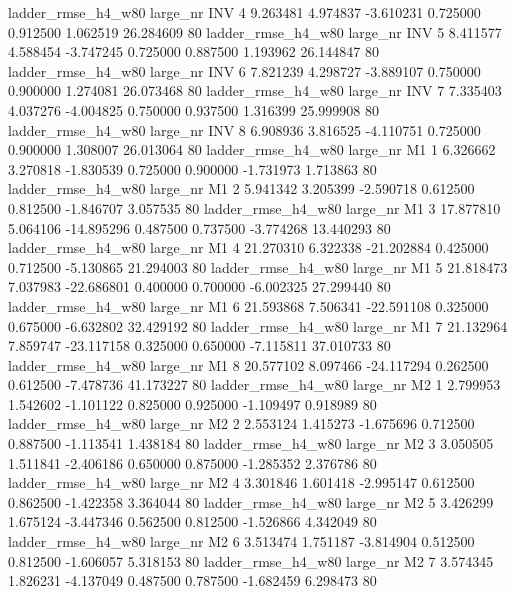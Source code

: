  ladder_rmse_h4_w80   large_nr      INV                 4  9.263481  4.974837  -3.610231 0.725000 0.912500  1.062519   26.284609 80
 ladder_rmse_h4_w80   large_nr      INV                 5  8.411577  4.588454  -3.747245 0.725000 0.887500  1.193962   26.144847 80
 ladder_rmse_h4_w80   large_nr      INV                 6  7.821239  4.298727  -3.889107 0.750000 0.900000  1.274081   26.073468 80
 ladder_rmse_h4_w80   large_nr      INV                 7  7.335403  4.037276  -4.004825 0.750000 0.937500  1.316399   25.999908 80
 ladder_rmse_h4_w80   large_nr      INV                 8  6.908936  3.816525  -4.110751 0.725000 0.900000  1.308007   26.013064 80
 ladder_rmse_h4_w80   large_nr       M1                 1  6.326662  3.270818  -1.830539 0.725000 0.900000 -1.731973    1.713863 80
 ladder_rmse_h4_w80   large_nr       M1                 2  5.941342  3.205399  -2.590718 0.612500 0.812500 -1.846707    3.057535 80
 ladder_rmse_h4_w80   large_nr       M1                 3 17.877810  5.064106 -14.895296 0.487500 0.737500 -3.774268   13.440293 80
 ladder_rmse_h4_w80   large_nr       M1                 4 21.270310  6.322338 -21.202884 0.425000 0.712500 -5.130865   21.294003 80
 ladder_rmse_h4_w80   large_nr       M1                 5 21.818473  7.037983 -22.686801 0.400000 0.700000 -6.002325   27.299440 80
 ladder_rmse_h4_w80   large_nr       M1                 6 21.593868  7.506341 -22.591108 0.325000 0.675000 -6.632802   32.429192 80
 ladder_rmse_h4_w80   large_nr       M1                 7 21.132964  7.859747 -23.117158 0.325000 0.650000 -7.115811   37.010733 80
 ladder_rmse_h4_w80   large_nr       M1                 8 20.577102  8.097466 -24.117294 0.262500 0.612500 -7.478736   41.173227 80
 ladder_rmse_h4_w80   large_nr       M2                 1  2.799953  1.542602  -1.101122 0.825000 0.925000 -1.109497    0.918989 80
 ladder_rmse_h4_w80   large_nr       M2                 2  2.553124  1.415273  -1.675696 0.712500 0.887500 -1.113541    1.438184 80
 ladder_rmse_h4_w80   large_nr       M2                 3  3.050505  1.511841  -2.406186 0.650000 0.875000 -1.285352    2.376786 80
 ladder_rmse_h4_w80   large_nr       M2                 4  3.301846  1.601418  -2.995147 0.612500 0.862500 -1.422358    3.364044 80
 ladder_rmse_h4_w80   large_nr       M2                 5  3.426299  1.675124  -3.447346 0.562500 0.812500 -1.526866    4.342049 80
 ladder_rmse_h4_w80   large_nr       M2                 6  3.513474  1.751187  -3.814904 0.512500 0.812500 -1.606057    5.318153 80
 ladder_rmse_h4_w80   large_nr       M2                 7  3.574345  1.826231  -4.137049 0.487500 0.787500 -1.682459    6.298473 80
